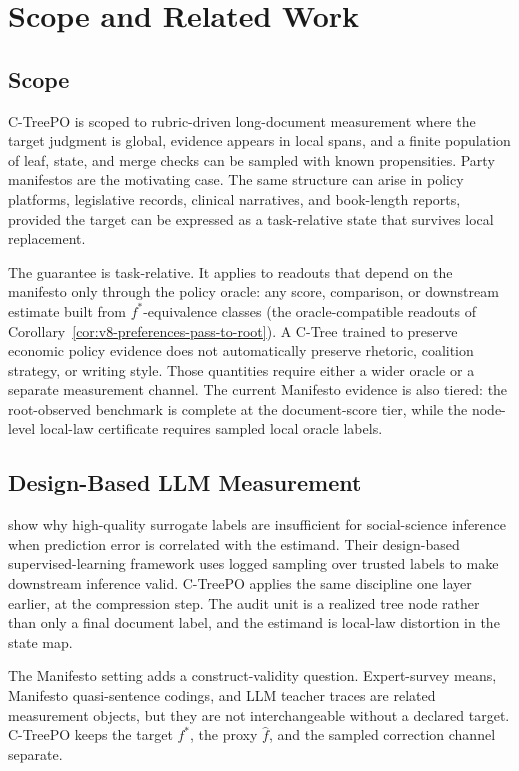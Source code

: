 \section{Scope and Related Work}\label{sec:v8-scope-related}

\subsection{Scope}

C-TreePO is scoped to rubric-driven long-document measurement where the target
judgment is global, evidence appears in local spans, and a finite population
of leaf, state, and merge checks can be sampled with known propensities. Party
manifestos are the motivating case. The same structure can arise in policy
platforms, legislative records, clinical narratives, and book-length reports,
provided the target can be expressed as a task-relative state that survives
local replacement.

The guarantee is task-relative. It applies to readouts that depend on
the manifesto only through the policy oracle: any score, comparison,
or downstream estimate built from \(f^\ast\)-equivalence classes (the
oracle-compatible readouts of
Corollary~\ref{cor:v8-preferences-pass-to-root}). A C-Tree trained to
preserve economic policy evidence does not automatically preserve
rhetoric, coalition strategy, or writing style. Those quantities
require either a wider oracle or a separate measurement channel. The
current Manifesto evidence is also tiered: the root-observed
benchmark is complete at the document-score tier, while the
node-level local-law certificate requires sampled local oracle
labels.

\subsection{Design-Based LLM Measurement}

\citet{EgamiEtAl2024} show why high-quality surrogate labels are insufficient
for social-science inference when prediction error is correlated with the
estimand. Their design-based supervised-learning framework uses logged
sampling over trusted labels to make downstream inference valid. C-TreePO
applies the same discipline one layer earlier, at the compression step. The
audit unit is a realized tree node rather than only a final document label,
and the estimand is local-law distortion in the state map.

The Manifesto setting adds a construct-validity question. Expert-survey means,
Manifesto quasi-sentence codings, and LLM teacher traces are related
measurement objects, but they are not interchangeable without a declared
target. C-TreePO keeps the target \(f^\ast\), the proxy \(\widehat f\), and
the sampled correction channel separate.

